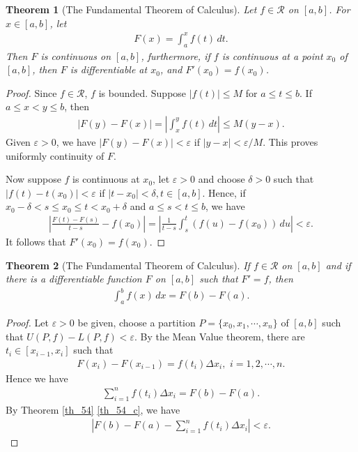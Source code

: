 \documentclass[10pt]{book}
\newtheorem{theorem}{Theorem}[chapter]
\theoremstyle{definition}
\numberwithin{equation}{chapter}
\begin{document}
\begin{theorem}[The Fundamental Theorem of Calculus]
Let $f \in \mathscr{R}$ on $[a,b]$. For $x \in [a,b]$, let
\begin{align*}
    F(x) = \int^x_a f(t) \,dt.
\end{align*}
Then $F$ is continuous on $[a,b]$, furthermore, if $f$ is continuous at a point $x_0$ of $[a,b]$, then $F$ is differentiable at $x_0$, and $F'(x_0) = f(x_0)$.
\end{theorem}
\begin{proof}
Since $f \in \mathscr{R}$, $f$ is bounded. Suppose $\left|f(t)\right| \leq M$ for $a \leq t \leq b$. If $a \leq x < y \leq b$, then
\begin{align*}
    \left|F(y) - F(x)\right| = \left|\int^y_x f(t) \,dt\right| \leq M(y - x).
\end{align*}
Given $\varepsilon > 0$, we have $\left|F(y) - F(x)\right| < \varepsilon$ if $\left|y - x\right| < \varepsilon/M$. This proves uniformly continuity of $F$.

Now suppose $f$ is continuous at $x_0$, let $\varepsilon > 0$ and choose $\delta > 0$ such that $\left|f(t) - t(x_0)\right| < \varepsilon$ if $\left|t - x_0\right| < \delta, t \in [a,b]$. Hence, if $x_0 - \delta < s \leq x_0 \leq t < x_0 + \delta$ and $a \leq s < t \leq b$, we have
\begin{align*}
    \left|\frac{F(t) - F(s)}{t - s} - f(x_0)\right| = \left|\frac{1}{t - s} \int^t_s (f(u) - f(x_0)) \,du \right| < \varepsilon.
\end{align*}
It follows that $F'(x_0) = f(x_0)$.
\end{proof}

\medskip

\begin{theorem}[The Fundamental Theorem of Calculus]\label{th_516}
If $f \in \mathscr{R}$ on $[a,b]$ and if there is a differentiable function $F$ on $[a,b]$ such that $F' = f$, then
\begin{align*}
    \int^b_a f(x) \,dx = F(b) - F(a).
\end{align*}
\end{theorem}
\begin{proof}
Let $\varepsilon > 0$ be given, choose a partition $P = \{x_0,x_1,\cdots,x_n\}$ of $[a,b]$ such that $U(P,f) - L(P,f) < \varepsilon$. By the Mean Value theorem, there are $t_i \in [x_{i-1},x_i]$ such that 
\begin{align*}
    F(x_i) - F(x_{i-1}) = f(t_i) \Delta x_i, \,\, i = 1,2,\cdots,n.
\end{align*}
Hence we have 
\begin{align*}
    \sum^n_{i=1} f(t_i) \Delta x_i = F(b) - F(a).
\end{align*}
By Theorem \ref{th_54} \ref{th_54_c}, we have
\begin{align*}
    \left|F(b) - F(a) - \sum^n_{i=1} f(t_i) \Delta x_i \right| < \varepsilon.
\end{align*}
\end{proof}
\end{document}
